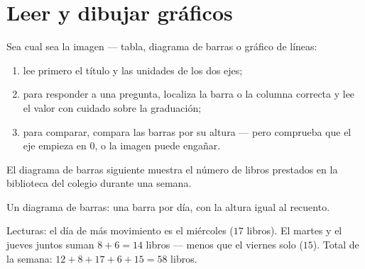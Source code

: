 \section{Leer y dibujar gráficos}

\begin{method}\label{met:g6:propdata:read}
Sea cual sea la imagen --- tabla, diagrama de barras o gráfico de líneas:
\begin{enumerate}
  \item lee primero el título y las unidades de los dos ejes;
  \item para responder a una pregunta, localiza la barra o la columna correcta y lee
        el valor con cuidado sobre la graduación;
  \item para comparar, compara las barras por su altura --- pero comprueba que el eje
        empieza en $0$, o la imagen puede engañar.
\end{enumerate}
\end{method}

\begin{example}\label{ex:g6:propdata:chart}
El diagrama de barras siguiente muestra el número de libros prestados en la biblioteca
del colegio durante una semana.

\begin{omfigure}

{\small Un diagrama de barras: una barra por día, con la altura igual al recuento.}
\end{omfigure}

Lecturas: el día de más movimiento es el miércoles ($17$ libros). El martes y el
jueves juntos suman $8 + 6 = 14$ libros --- menos que el viernes
solo ($15$). Total de la semana:
$12 + 8 + 17 + 6 + 15 = 58$ libros.
\end{example}

